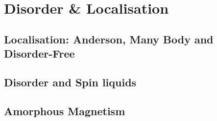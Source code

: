 \hypertarget{disorder-localisation}{%
\section{Disorder \& Localisation}\label{disorder-localisation}}

\hypertarget{localisation-anderson-many-body-and-disorder-free}{%
\subsection{Localisation: Anderson, Many Body and Disorder-Free}\label{localisation-anderson-many-body-and-disorder-free}}

\hypertarget{disorder-and-spin-liquids}{%
\subsection{Disorder and Spin liquids}\label{disorder-and-spin-liquids}}

\hypertarget{amorphous-magnetism}{%
\subsection{Amorphous Magnetism}\label{amorphous-magnetism}}

\begin{Shaded}
\begin{Highlighting}[]

\end{Highlighting}
\end{Shaded}
